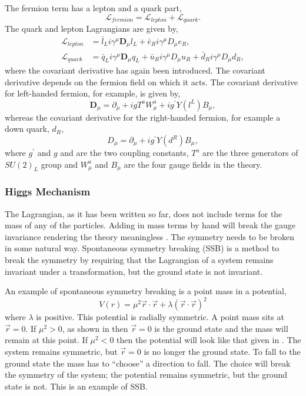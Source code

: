 The fermion term has a lepton and a quark part,
\begin{equation}
\mathcal{L}_{fermion} =
 \mathcal{L}_{lepton}
+ \mathcal{L}_{quark}.
\end{equation}
The quark and lepton Lagrangians are given by,
\begin{align*}
\mathcal{L}_{lepton} &= 
\bar{l}_{L} i \gamma^{\mu} \mathbf{D}_{\mu} l_{L} +
\bar{e}_{R} i \gamma^{\mu} D_{\mu} e_{R}, \\
\mathcal{L}_{quark} &= 
\bar{q}_{L} i \gamma^{\mu} \mathbf{D}_{\mu} q_{L} +
\bar{u}_{R} i \gamma^{\mu} D_{\mu} u_{R} +
\bar{d}_{R} i \gamma^{\mu} D_{\mu} d_{R},
\end{align*}
where the covariant derivative has again been introduced.
The covariant derivative depends on the fermion field on which it acts. The covariant derivative
for left-handed fermion, for example, is given by,
\begin{equation}
\mathbf{D}_\mu 
= \partial_\mu 
+ ig{T}^{a}W_{\mu}^{a}
+ ig^{\prime}Y(l^{L})B_{\mu},
\end{equation}
whereas the covariant derivative for the right-handed fermion, for example a
down quark, $d_R$,
\begin{equation}
D_\mu = \partial_\mu + ig^{\prime}Y(d^{R})B_{\mu},
\end{equation}
where $g^\prime$ and $g$ and are the two coupling constants, ${T}^{a}$ are the
three generators of $SU(2)_L$ group and $W^{a}_{\mu}$ and $B_{\mu}$ are the four
gauge fields in the theory.

\subsubsection{Higgs Mechanism}

The Lagrangian, as it has been written so far, does not include terms for the
mass of any of the particles.  Adding in mass terms by hand will break the gauge
invariance rendering the theory meaningless \cite{ral}.
The symmetry needs to be broken in some natural way.  Spontaneous symmetry
breaking (SSB) is a method to break the symmetry by requiring that the Lagrangian of a
system remains invariant under a transformation, but the ground state is not
invariant.

An example of spontaneous symmetry breaking is a point mass in a potential,
\begin{equation}
V(r) = \mu^{2} \vec{r} \cdot \vec{r} + \lambda ( \vec{r} \cdot \vec{r} )^{2}
\end{equation}
where $\lambda$ is positive. This potential is radially symmetric. 
A point mass sits at $\vec{r}=0$. If $\mu^{2}>0$, as shown in
 then $\vec{r}=0$ is the ground state and
the mass will remain at this point.
If $\mu^{2}<0$ then the potential will look like that given in
. The system remains symmetric, but $\vec{r}=0$ is no longer
the ground state. To fall to the ground state the mass has to ``choose'' a
direction to fall. The choice will break the symmetry of the system; the
potential remains symmetric, but the ground state is not. This is an example of
{SSB}.

